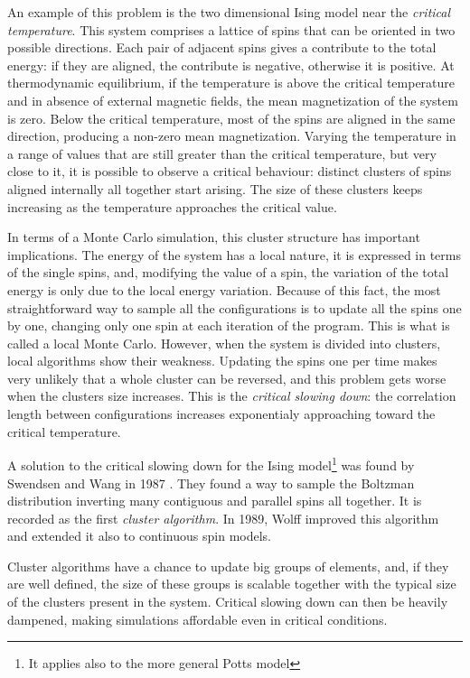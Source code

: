 An example of this problem is the two dimensional Ising model near the \emph{critical temperature}.
This system comprises a lattice of spins that can be oriented in two possible directions.
Each pair of adjacent spins gives a contribute to the total energy: if they are aligned, the contribute is negative, otherwise it is positive.
At thermodynamic equilibrium, if the temperature is above the critical temperature and in absence of external magnetic fields, the mean magnetization of the system is zero.
Below the critical temperature, most of the spins are aligned in the same direction, producing a non-zero mean magnetization.
Varying the temperature in a range of values that are still greater than the critical temperature, but very close to it,
it is possible to observe a critical behaviour: distinct clusters of spins aligned internally all together start arising.
The size of these clusters keeps increasing as the temperature approaches the critical value.

In terms of a Monte Carlo simulation, this cluster structure has important implications.
The energy of the system has a local nature,
\ie it is expressed in terms of the single spins, and, modifying the value of a spin,
the variation of the total energy is only due to the local energy variation.
Because of this fact, the most straightforward way to sample all the configurations is to update all the spins one by one,
changing only one spin at each iteration of the program. This is what is called a local Monte Carlo.
However, when the system is divided into clusters, local algorithms show their weakness.
Updating the spins one per time makes very unlikely that a whole cluster can be reversed,
and this problem gets worse when the clusters size increases.
This is the \emph{critical slowing down}: the correlation length between configurations increases exponentialy approaching toward the critical temperature.

A solution to the critical slowing down for the Ising model\footnote{It applies also to the more general Potts model} was found by Swendsen and Wang in 1987 \cite{swendsen-wang:1987}.
They found a way to sample the Boltzman distribution inverting many contiguous and parallel spins all together.
It is recorded as the first \emph{cluster algorithm}.
In 1989, Wolff \cite{wolff:1989} improved this algorithm and extended it also to continuous spin models.

Cluster algorithms have a chance to update big groups of elements, and, if they are well defined,
the size of these groups is scalable together with the typical size of the clusters present in the system.
Critical slowing down can then be heavily dampened, making simulations affordable even in critical conditions.

